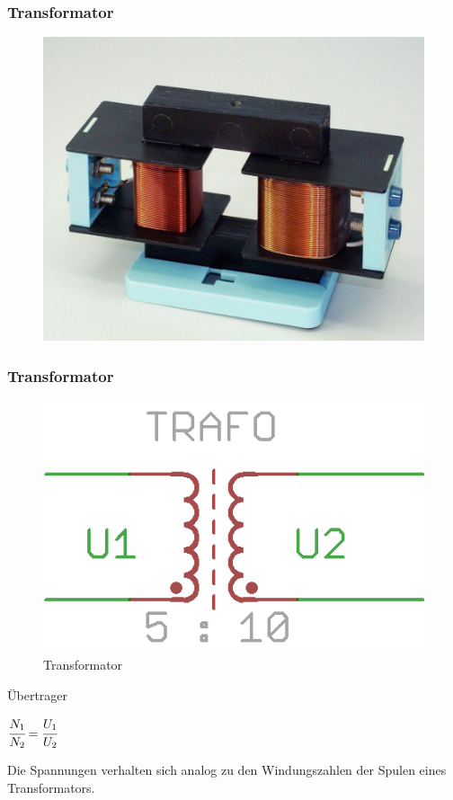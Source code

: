 \begin{frame}
  \frametitle{Transformator}
  \begin{center}
    \begin{figure}
      \includegraphics[width=\textwidth,height=.75\textheight,keepaspectratio]{e06/trafo-Real.jpg}
    \end{figure}
  \end{center}
\end{frame}

\begin{frame}
  \frametitle{Transformator}
  \begin{center}
    \begin{figure}
      \includegraphics[width=\textwidth,height=.3\textheight,keepaspectratio]{e06/Trafo.png}
      \caption{Transformator}
    \end{figure}
  \end{center}
  \begin{block}{Übertrager}
    \begin{center}
      $\cfrac{N_1}{N_2} = \cfrac{U_1}{U_2}$
    \end{center}
  \end{block}
  Die Spannungen verhalten sich analog zu den Windungszahlen der Spulen eines Transformators.
\end{frame}

